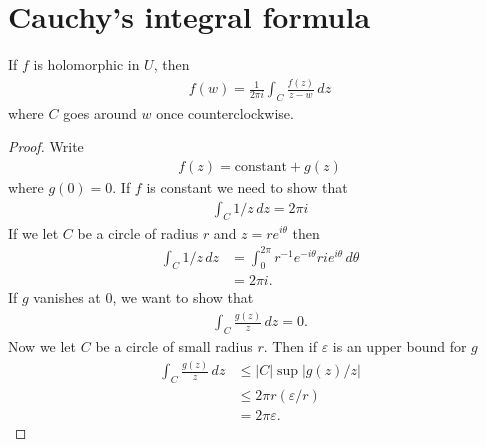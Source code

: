 \documentclass[11pt, oneside,margin=1in]{article}
\begin{document}
\section{Cauchy's integral formula}
If $f$ is holomorphic in $U$, then 
\begin{align*}
	f(w)=  \frac{1}{2\pi i} \int_{C}^{} \frac{f(z)}{z-w}  \, dz 
\end{align*}
where $C$ goes around $w$ once counterclockwise. 
\begin{proof}
Write
\begin{align*}
	f(z) = \textrm{constant} + g (z)
\end{align*}
where $g(0)=0$. If $f$ is constant we need to show that
\begin{align*}
	\int_{C}^{} 1/z  \, dz = 2\pi i 
\end{align*}
If we let $C$ be a circle of radius $r$ and $z=re^{i\theta}$ then
\begin{align*}
	\int_{C}^{} 1/z  \, dz &= \int_{0}^{2\pi} r^{-1}e^{-i\theta} r ie^{i\theta}  \, d\theta\\
			       &= 2\pi i.
\end{align*}
If $g$ vanishes at $0$, we want to show that 
\begin{align*}
	\int_{C}^{} \frac{g(z)}{z}  \, dz = 0. 
\end{align*}
Now we let $C$ be a circle of small radius $r$. Then if $\varepsilon$ is an upper bound for $g$
\begin{align*}
	\int_{C}^{} \frac{g(z)}{z}  \, dz & \le \left\lvert C \right\rvert \sup \left\lvert g(z)/z \right\rvert \\
					  &\le 2\pi r (\varepsilon/r) \\
					  &=2\pi \varepsilon.
\end{align*}
\end{proof}
\end{document}
